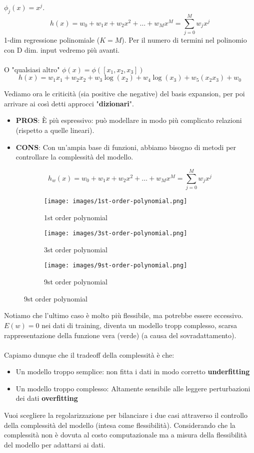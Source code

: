 \begin{example}
    [1-dim $x$] \hspace{15pt} $\phi_j(x) = x^j$.
    $$h(x) = w_0 + w_1x + w_2x^2 + \dots + w_Mx^M = \sum_{j=0}^{M}w_jx^j$$
    1-dim regressione polinomiale ($K=M$). Per il numero di termini nel polinomio con D dim. input vedremo più avanti.\\\\
    O "qualsiasi altro" $\phi(x) = \phi([x_1, x_2, x_3])$
    $$h(x) = w_1x_1 + w_2 x_2 + w_3 \log(x_2) + w_4\log(x_3) + w_5(x_2x_3) + w_0$$
\end{example}
\hspace{-15pt}Vediamo ora le criticità (sia positive che negative) del basis expansion, per poi arrivare 
ai così detti approcci "\textbf{dizionari}".
\begin{itemize}
    \item \textbf{PROS}: È più espressivo: può modellare in modo più complicato
    relazioni (rispetto a quelle lineari).
    \item \textbf{CONS}: Con un'ampia base di funzioni, abbiamo bisogno di metodi per
    controllare la complessità del modello.
\end{itemize}
$$h_w(x) = w_0 + w_1x + w_2x^2 + \dots + w_Mx^M = \sum_{j=0}^{M}w_jx^j$$
\newpage
\begin{figure}[h!]
    \centering
    \begin{subfigure}{.3\textwidth}
        \texttt{[image: images/1st-order-polynomial.png]}
        \caption{1st order polynomial}
    \end{subfigure}
    \begin{subfigure}{.3\textwidth}
        \texttt{[image: images/3st-order-polynomial.png]}
        \caption{3st order polynomial}
    \end{subfigure}
    \begin{subfigure}{.3\textwidth}
        \texttt{[image: images/9st-order-polynomial.png]}
        \caption{9st order polynomial}
    \end{subfigure}
\end{figure}

\hspace{-15pt}Notiamo che l'ultimo caso è molto più flessibile, ma potrebbe essere eccessivo. $E(w) = 0$ nei dati di training, diventa
un modello tropp complesso, scarsa rappresentazione della funzione vera (verde) (a causa del sovradattamento).\\\\
Capiamo dunque che il tradeoff della complessità è che:
\begin{itemize}
    \item Un modello troppo semplice: non fitta i dati in modo corretto \textbf{underfitting}
    \item Un modello troppo complesso: Altamente sensibile alle leggere perturbazioni dei dati \textbf{overfitting}
\end{itemize}
Vuoi scegliere la regolarizzazione per bilanciare i due casi attraverso il controllo della complessità del modello (intesa come flessibilità).
Considerando che la complessità non è dovuta al costo computazionale ma a misura della flessibilità del modello per adattarsi ai dati.

